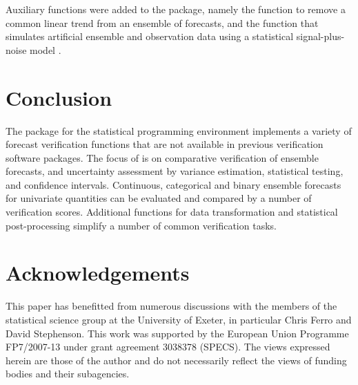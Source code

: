 \documentclass[article]{jss}\usepackage{graphicx, color}
\begin{document}
Auxiliary functions were added to the package, namely the function  to remove a common linear trend from an ensemble of forecasts, and the function  that simulates artificial ensemble and observation data using a statistical signal-plus-noise model \citep{siegert2016bayesian}.




\section{Conclusion}

The package  for the  statistical programming environment implements a variety of forecast verification functions that are not available in previous verification software packages.
The focus of  is on comparative verification of ensemble forecasts, and uncertainty assessment by variance estimation, statistical testing, and confidence intervals.
Continuous, categorical and binary ensemble forecasts for univariate quantities can be evaluated and compared by a number of verification scores.
Additional functions for data transformation and statistical post-processing simplify a number of common verification tasks.


\section*{Acknowledgements}

This paper has benefitted from numerous discussions with the members of the statistical science group at the University of Exeter, in particular Chris Ferro and David Stephenson.
This work was supported by the European Union Programme FP7/2007-13 under grant agreement 3038378 (SPECS).
The views expressed herein are those of the author and do not necessarily reflect the views of funding bodies and their subagencies.



\end{document}
